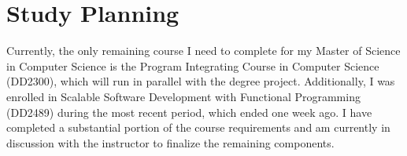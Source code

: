 \documentclass{article}
\begin{document}
\section{Study Planning}
Currently, the only remaining course I need to complete for my Master of Science in Computer Science is the Program Integrating Course in Computer Science (DD2300), which will run in parallel with the degree project. Additionally, I was enrolled in Scalable Software Development with Functional Programming (DD2489) during the most recent period, which ended one week ago. I have completed a substantial portion of the course requirements and am currently in discussion with the instructor to finalize the remaining components.
\end{document}

